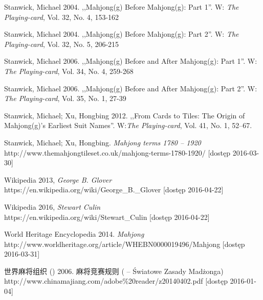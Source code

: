 Stanwick, Michael 2004. ,,Mahjong(g) Before Mahjong(g): Part 1''. W:
\textit{The Playing-card}, Vol. 32, No. 4, 153-162

Stanwick, Michael 2004. ,,Mahjong(g) Before Mahjong(g): Part 2''. W:
\textit{The Playing-card}, Vol. 32, No. 5, 206-215

Stanwick, Michael 2006. ,,Mahjong(g) Before and After Mahjong(g): Part 1''. W:
\textit{The Playing-card}, Vol. 34, No. 4, 259-268

Stanwick, Michael 2006. ,,Mahjong(g) Before and After Mahjong(g): Part 2''. W:
\textit{The Playing-card}, Vol. 35, No. 1, 27-39


Stanwick, Michael; Xu, Hongbing 2012. ,,From Cards to Tiles: The Origin of
Mahjong(g)’s Earliest Suit Names''. W:\textit{The Playing-card}, Vol. 41, No. 1,
52–67.

Stanwick, Michael; Xu, Hongbing. \textit{Mahjong terms 1780 – 1920}
\\http://www.themahjongtileset.co.uk/mahjong-terms-1780-1920/ [dostęp
2016-03-30]

Wikipedia 2013, \textit{George B. Glover}
\\https://en.wikipedia.org/wiki/George\_B.\_Glover [dostęp 2016-04-22]

Wikipedia 2016, \textit{Stewart Culin}
\\https://en.wikipedia.org/wiki/Stewart\_Culin [dostęp 2016-04-22]

World Heritage Encyclopedia 2014. \textit{Mahjong}
\\http://www.worldheritage.org/article/WHEBN0000019496/Mahjong [dostęp
2016-03-31]

世界麻将组织 () 2006. 麻将竞赛规则 ( -- Światowe Zasady Madżonga)
\\http://www.chinamajiang.com/adobe\%20reader/z20140402.pdf [dostęp 2016-01-04]





